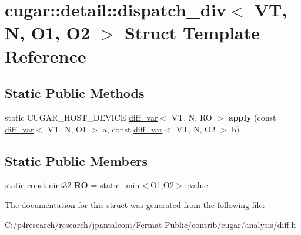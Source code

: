 \hypertarget{structcugar_1_1detail_1_1dispatch__div}{}\section{cugar\+:\+:detail\+:\+:dispatch\+\_\+div$<$ VT, N, O1, O2 $>$ Struct Template Reference}
\label{structcugar_1_1detail_1_1dispatch__div}
\subsection*{Static Public Methods}
\begin{DoxyCompactItemize}
\item 
\mbox{\label{structcugar_1_1detail_1_1dispatch__div_af1b4fbe9793258c33fd26319b5b535d2}} 
static C\+U\+G\+A\+R\+\_\+\+H\+O\+S\+T\+\_\+\+D\+E\+V\+I\+CE \hyperlink{structcugar_1_1diff__var}{diff\+\_\+var}$<$ VT, N, RO $>$ {\bfseries apply} (const \hyperlink{structcugar_1_1diff__var}{diff\+\_\+var}$<$ VT, N, O1 $>$ a, const \hyperlink{structcugar_1_1diff__var}{diff\+\_\+var}$<$ VT, N, O2 $>$ b)
\end{DoxyCompactItemize}
\subsection*{Static Public Members}
\begin{DoxyCompactItemize}
\item 
\mbox{\label{structcugar_1_1detail_1_1dispatch__div_af6ce5613b42fc2aa0494febb7440733a}} 
static const uint32 {\bfseries RO} = \hyperlink{structcugar_1_1static__min}{static\+\_\+min}$<$O1,O2$>$\+::value
\end{DoxyCompactItemize}


The documentation for this struct was generated from the following file\+:\begin{DoxyCompactItemize}
\item 
C\+:/p4research/research/jpantaleoni/\+Fermat-\/\+Public/contrib/cugar/analysis/\hyperlink{diff_8h}{diff.\+h}\end{DoxyCompactItemize}
